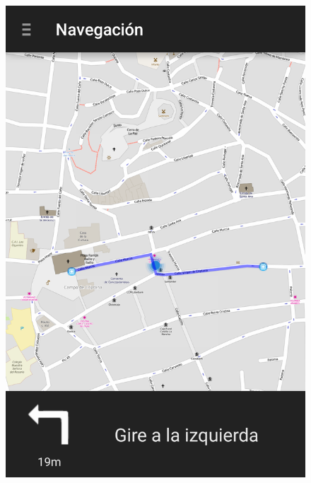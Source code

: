 \begin{slide}
\begin{center}
\begin{minipage}[b]{0.3\linewidth}
\begin{center}
\begin{figure}
          \includegraphics[height=0.65\textheight]{img/naviganto-rutaizquierda.png}
        \end{figure}
      \end{center}
    \end{minipage}
    \begin{minipage}[b]{0.3\linewidth}
      \begin{center}
        \begin{figure}

\end{figure}
\end{center}
\end{minipage}
\end{center}
\end{slide}
